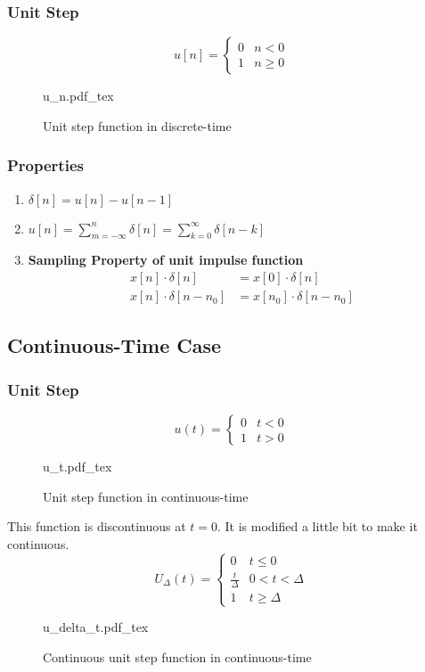 \documentclass[oneside]{book}
\newcommand{\incfig}[1]{%
    {#1.pdf_tex}
}
\begin{document}
\subsubsection{Unit Step}
\[
	u[n] = \begin{cases}
		0 & n < 0    \\
		1 & n \geq 0
	\end{cases}
\]
\begin{figure}[ht]
	\centering
	\incfig{u_n}
	\caption{Unit step function in discrete-time}
\end{figure}
\subsubsection{Properties}
\begin{enumerate}
	\item \(\delta[n] = u[n] - u[n-1]\)
	\item \(u[n] = \sum\limits_{m = -\infty}^{n}\delta[n] = \sum\limits_{k = 0}^{\infty}\delta[n-k]\)
	\item \textbf{Sampling Property of unit impulse function}
	      \begin{align*}
		      x[n]\cdot\delta[n]     & = x[0]\cdot\delta[n]         \\
		      x[n]\cdot\delta[n-n_0] & = x[n_0]\cdot\delta[n - n_0]
	      \end{align*}
\end{enumerate}
\subsection{Continuous-Time Case}
\subsubsection{Unit Step}
\[
	u(t) = \begin{cases}
		0 & t < 0 \\
		1 & t > 0
	\end{cases}
\]
\begin{figure}[ht]
	\centering
	\incfig{u_t}
	\caption{Unit step function in continuous-time}
\end{figure}
This function is discontinuous at $t = 0$. It is modified a little bit to make it continuous.
\[
	U_\Delta(t) = \begin{cases}
		0                & t\leq0        \\
		\frac{t}{\Delta} & 0< t < \Delta \\
		1                & t \geq \Delta
	\end{cases}
\]
\begin{figure}[ht]
	\centering
	\incfig{u_delta_t}
	\caption{Continuous unit step function in continuous-time}
\end{figure}
\end{document}
